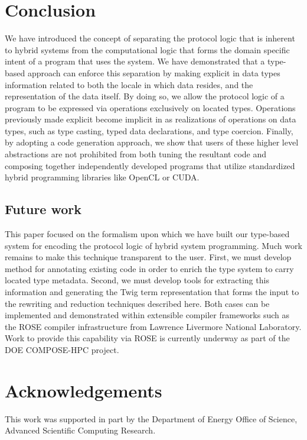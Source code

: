 
\section{Conclusion}

We have introduced the concept of separating the protocol logic that is inherent
to hybrid systems from the computational logic that forms the domain specific
intent of a program that uses the system. We have demonstrated that a type-based
approach can enforce this separation by making explicit in data types
information related to both the locale in which data resides, and the
representation of the data itself. By doing so, we allow the protocol logic of a
program to be expressed via operations exclusively on located types. Operations
previously made explicit become implicit in as realizations of operations on
data types, such as type casting, typed data declarations, and type coercion.
Finally, by adopting a code generation approach, we show that users of these
higher level abstractions are not prohibited from both tuning the resultant code
and composing together independently developed programs that utilize
standardized hybrid programming libraries like OpenCL or CUDA.

\subsection{Future work}

This paper focused on the formalism upon which we have built our type-based
system for encoding the protocol logic of hybrid system programming. Much work
remains to make this technique transparent to the user. First, we must develop
method for annotating existing code in order to enrich the type system to carry
located type metadata. Second, we must develop tools for extracting this
information and generating the Twig term representation that forms the input to
the rewriting and reduction techniques described here. Both cases can be
implemented and demonstrated within extensible compiler frameworks such as the
ROSE compiler infrastructure from Lawrence Livermore National Laboratory. Work
to provide this capability via ROSE is currently underway as part of the DOE
COMPOSE-HPC project.

\section{Acknowledgements}

This work was supported in part by the Department of Energy Office of Science,
Advanced Scientific Computing Research.
